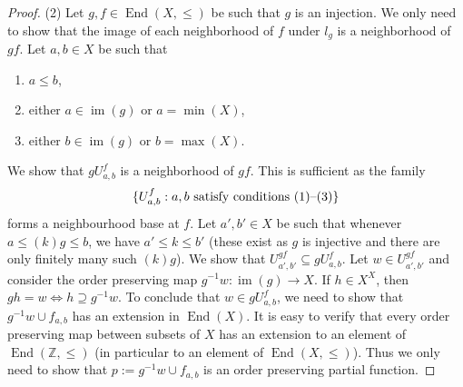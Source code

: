 \documentclass[11pt]{amsart}
\theoremstyle{definition}
\newcommand{\Xendd}{\operatorname{End}(X, \leq)}
\newcommand{\Z}{\mathbb Z}
\newcommand{\im}{\operatorname{im}}
\begin{document}
\begin{proof}




(2) Let $g, f\in\Xendd$ be such that \(g\) is an injection. We only need to show that the image of each neighborhood of \(f\) under \(l_g\) is a neighborhood of \(gf\).
Let \(a,b\in X\) be such that 
\begin{enumerate}
    \item \(a\leq b\),
    \item either \(a\in \im(g)\) or \(a=\min(X)\),
    \item either \(b\in \im(g)\) or \(b=\max(X)\).
\end{enumerate}
We show that \(gU^f_{a,b}\) is a neighborhood of \(gf\). This is sufficient as the family \[\{U_{a,b}^f: a,b \hbox{ satisfy conditions } (1)\hbox{--}(3)\}\] forms a neighbourhood base at \(f\).
Let \(a',b'\in X\) be such that whenever \(a\leq (k)g \leq b\), we have \(a'\leq k \leq b'\) (these exist as \(g\) is injective and there are only finitely many such \((k)g\)).
We show that \(U^{gf}_{a',b'} \subseteq gU^f_{a,b}\).
Let \(w\in U^{gf}_{a',b'}\) and consider the order preserving map \(g^{-1}w:\im(g) \to X\).
If \(h\in X^X\), then \(gh=w \iff h\supseteq g^{-1}w\). 
To conclude that \(w\in gU^f_{a,b}\), we need to show that \(g^{-1}w\cup f_{a,b}\) has an extension in \(\operatorname{End}(X)\).
It is easy to verify that every order preserving map between subsets of \(X\) has an extension to an element of \(\operatorname{End}(\Z,\leq)\) (in particular to an element of \(\operatorname{End}(X,\leq)\)).
Thus we only need to show that \(p:=g^{-1}w\cup f_{a,b}\) is an order preserving partial function.


\end{proof}
\end{document}
